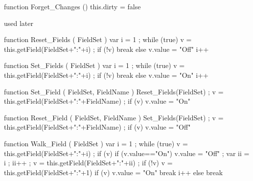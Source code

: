 function Forget_Changes ()
  { this.dirty = false }

\stopJSpreamble

%



 used later

function Reset_Fields ( FieldSet ) 
  { var i = 1 ; 
    while (true) 
      { v = this.getField(FieldSet+":"+i) ; 
        if (!v) 
          { break }  
        else 
          { v.value = "Off" } 
        i++ } } 

function Set_Fields ( FieldSet ) 
  { var i = 1 ; 
    while (true) 
      { v = this.getField(FieldSet+":"+i) ; 
        if (!v) 
          { break }  
        else 
          { v.value = "On" } 
        i++ } } 

function Set_Field ( FieldSet, FieldName ) 
  { Reset_Fields(FieldSet) ; 
    v = this.getField(FieldSet+":"+FieldName) ; 
    if (v) { v.value = "On" } }

function Reset_Field ( FieldSet, FieldName ) 
  { Set_Fields(FieldSet) ; 
    v = this.getField(FieldSet+":"+FieldName) ; 
    if (v) { v.value = "Off" } }

function Walk_Field ( FieldSet ) 
  { var i = 1 ; 
    while (true) 
      { v = this.getField(FieldSet+":"+i) ; 
        if (v) 
          { if (v.value=="On") 
              { v.value = "Off" ; 
                var ii = i ; ii++ ; 
                v = this.getField(FieldSet+":"+ii) ; 
                if (!v) 
                  { v = this.getField(FieldSet+":"+1) }
                if (v) 
                  { v.value = "On" }
                break }
            i++ } 
        else
          { break } } }

\stopJSpreamble

\endinput
